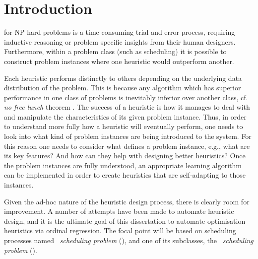 
\chapter{Introduction}\label{ch:introduction} 

 for NP-hard problems is a time 
consuming trial-and-error process, requiring inductive reasoning or problem 
specific insights from their human designers. Furthermore, within a problem 
class (such as scheduling) it is possible to construct problem instances where 
one heuristic would outperform another. 

Each heuristic performs distinctly to others depending on the underlying data 
distribution of the problem. This is because any algorithm which 
has superior performance in one class of problems is inevitably inferior over 
another class, cf. \emph{no free lunch} theorem \citep{Wolpert97nofree}. 
The success of a heuristic is how it manages to deal with and manipulate the 
characteristics of its given problem instance. Thus, in order to understand 
more fully how a heuristic will eventually perform, one needs to look into what 
kind of problem instances are being introduced to the system. 
For this reason one needs to consider what defines a 
problem instance, e.g., what are its key features? And how can they help with 
designing better heuristics? Once the problem instances are fully understood, 
an appropriate learning algorithm can be implemented in order to create 
heuristics that are  self-adapting to those instances.

Given the ad-hoc nature of the heuristic design process, there is clearly room 
for improvement. A number of attempts have been made to automate heuristic 
design, and it is the ultimate goal of this dissertation to automate 
optimisation heuristics via ordinal regression. 
The focal point will be based on scheduling processes named \emph{\jsp\ 
scheduling problem} (\JSP), and one of its subclasses, the \emph{\fsp\ 
scheduling problem} (\FSP).


